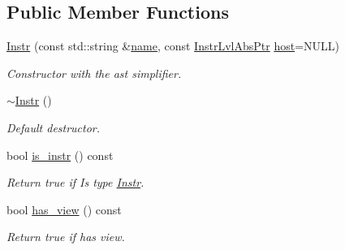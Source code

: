 \subsection*{Public Member Functions}
\begin{DoxyCompactItemize}
\item 
\mbox{\label{classilang_1_1_instr_a3a91fc99f1ff0dbbd653f872d15e5911}} 
\mbox{\hyperlink{classilang_1_1_instr_a3a91fc99f1ff0dbbd653f872d15e5911}{Instr}} (const std\+::string \&\mbox{\hyperlink{classilang_1_1_object_acf20b072e69f572910d7d80c93af0b38}{name}}, const \mbox{\hyperlink{classilang_1_1_instr_ab36b0ed04e0c44e66867ed1d61009f12}{Instr\+Lvl\+Abs\+Ptr}} \mbox{\hyperlink{classilang_1_1_instr_a302d102dcc5e8c47f97f37391d656179}{host}}=N\+U\+LL)
\begin{DoxyCompactList}\small\item\em Constructor with the ast simplifier. \end{DoxyCompactList}\item 
\mbox{\label{classilang_1_1_instr_ac662ccbb043d9df495b822dcc4e556fd}} 
\mbox{\hyperlink{classilang_1_1_instr_ac662ccbb043d9df495b822dcc4e556fd}{$\sim$\+Instr}} ()
\begin{DoxyCompactList}\small\item\em Default destructor. \end{DoxyCompactList}\item 
\mbox{\label{classilang_1_1_instr_aebdf0767f422f79fcb43e004eeccce26}} 
bool \mbox{\hyperlink{classilang_1_1_instr_aebdf0767f422f79fcb43e004eeccce26}{is\+\_\+instr}} () const
\begin{DoxyCompactList}\small\item\em Return true if Is type \mbox{\hyperlink{classilang_1_1_instr}{Instr}}. \end{DoxyCompactList}\item 
\mbox{\label{classilang_1_1_instr_a79400cd2440dcb0518cc3beb993eef6b}} 
bool \mbox{\hyperlink{classilang_1_1_instr_a79400cd2440dcb0518cc3beb993eef6b}{has\+\_\+view}} () const
\begin{DoxyCompactList}\small\item\em Return true if has view. \end{DoxyCompactList}\item 

\end{DoxyCompactItemize}

